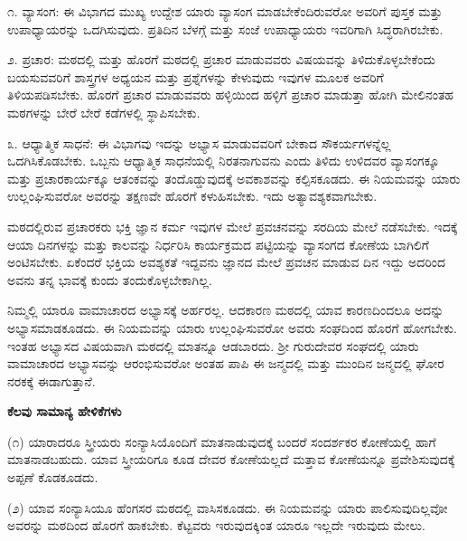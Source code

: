 ೧. ವ್ಯಾಸಂಗ: ಈ ವಿಭಾಗದ ಮುಖ್ಯ ಉದ್ದೇಶ ಯಾರು ವ್ಯಾಸಂಗ ಮಾಡಬೇಕೆಂದಿರುವರೋ ಅವರಿಗೆ ಪುಸ್ತಕ ಮತ್ತು ಉಪಾಧ್ಯಾಯರನ್ನು ಒದಗಿಸುವುದು. ಪ್ರತಿದಿನ ಬೆಳಗ್ಗೆ ಮತ್ತು ಸಂಜೆ ಉಪಾಧ್ಯಾಯರು ಇವರಿಗಾಗಿ ಸಿದ್ಧರಾಗಿರಬೇಕು.
\vspace{0.3cm}

೨. ಪ್ರಚಾರ: ಮಠದಲ್ಲಿ ಮತ್ತು ಹೊರಗೆ\enginline{-} ಮಠದಲ್ಲಿ ಪ್ರಚಾರ ಮಾಡುವವರು ವಿಷಯವನ್ನು ತಿಳಿದುಕೊಳ್ಳಬೇಕೆಂದು ಬಯಸುವವರಿಗೆ ಶಾಸ್ತ್ರಗಳ ಅಧ್ಯಯನ ಮತ್ತು ಪ್ರಶ್ನೆಗಳನ್ನು ಕೇಳುವುದು ಇವುಗಳ ಮೂಲಕ ಅವರಿಗೆ ತಿಳಿಯಪಡಿಸಬೇಕು. ಹೊರಗೆ ಪ್ರಚಾರ ಮಾಡುವವರು ಹಳ್ಳಿಯಿಂದ ಹಳ್ಳಿಗೆ ಪ್ರಚಾರ ಮಾಡುತ್ತಾ ಹೋಗಿ ಮೇಲಿನಂತಹ ಮಠಗಳನ್ನು ಬೇರೆ ಬೇರೆ ಕಡೆಗಳಲ್ಲಿ ಸ್ಥಾಪಿಸಬೇಕು.
\vspace{0.3cm}

೩. ಆಧ್ಯಾತ್ಮಿಕ ಸಾಧನೆ: ಈ ವಿಭಾಗವು ಇದನ್ನು ಅಭ್ಯಾಸ ಮಾಡುವವರಿಗೆ ಬೇಕಾದ ಸೌಕರ್ಯಗಳನ್ನೆಲ್ಲ ಒದಗಿಸಿಕೊಡಬೇಕು. ಒಬ್ಬನು ಆಧ್ಯಾತ್ಮಿಕ ಸಾಧನೆಯಲ್ಲಿ ನಿರತನಾಗುವನು ಎಂದು ತಿಳಿದು ಉಳಿದವರ ವ್ಯಾಸಂಗಕ್ಕೂ ಮತ್ತು ಪ್ರಚಾರಕಾರ್ಯಕ್ಕೂ ಆತಂಕವನ್ನು ತಂದೊಡ್ಡುವುದಕ್ಕೆ ಅವಕಾಶವನ್ನು ಕಲ್ಪಿಸಕೂಡದು. ಈ ನಿಯಮವನ್ನು ಯಾರು ಉಲ್ಲಂಘಿಸುವರೋ ಅವರನ್ನು ತಕ್ಷಣವೇ ಹೊರಗೆ ಕಳುಹಿಸಬೇಕು. ಇದು ಅತ್ಯಾವಶ್ಯಕವಾಗಬೇಕು.
\vspace{0.2cm}

ಮಠದಲ್ಲಿರುವ ಪ್ರಚಾರಕರು ಭಕ್ತಿ ಜ್ಞಾನ ಕರ್ಮ ಇವುಗಳ ಮೇಲೆ ಪ್ರವಚನವನ್ನು ಸರದಿಯ ಮೇಲೆ ನಡೆಸಬೇಕು. ಇದಕ್ಕೆ ಆಯಾ ದಿನಗಳನ್ನು ಮತ್ತು ಕಾಲವನ್ನು ನಿರ್ಧರಿಸಿ ಕಾರ್ಯಕ್ರಮದ ಪಟ್ಟಿಯನ್ನು ವ್ಯಾಸಂಗದ ಕೋಣೆಯ ಬಾಗಿಲಿಗೆ ಅಂಟಿಸಬೇಕು. ಏಕೆಂದರೆ ಭಕ್ತಿಯ ಅವಶ್ಯಕತೆ ಇದ್ದವನು ಜ್ಞಾನದ ಮೇಲೆ ಪ್ರವಚನ ಮಾಡುವ ದಿನ ಇದ್ದು ಅದರಿಂದ ಅವನು ತನ್ನ ಭಾವಕ್ಕೆ ಕುಂದು ತಂದುಕೊಳ್ಳಬೇಕಾಗಿಲ್ಲ.

\vspace{0.2cm}

ನಿಮ್ಮಲ್ಲಿ ಯಾರೂ ವಾಮಾಚಾರದ ಅಭ್ಯಾಸಕ್ಕೆ ಅರ್ಹರಲ್ಲ. ಆದಕಾರಣ ಮಠದಲ್ಲಿ ಯಾವ ಕಾರಣದಿಂದಲೂ ಅದನ್ನು ಅಭ್ಯಾಸಮಾಡಕೂಡದು. ಈ ನಿಯಮವನ್ನು ಯಾರು ಉಲ್ಲಂಘಿಸುವರೋ ಅವರು ಸಂಘದಿಂದ ಹೊರಗೆ ಹೋಗಬೇಕು. ಇಂತಹ ಅಭ್ಯಾಸದ ವಿಷಯವಾಗಿ ಮಠದಲ್ಲಿ ಮಾತನ್ನೂ ಆಡಬಾರದು. ಶ‍್ರೀ ಗುರುದೇವರ ಸಂಘದಲ್ಲಿ ಯಾರು ವಾಮಾಚಾರದ ಅಭ್ಯಾಸವನ್ನು ಆರಂಭಿಸುವರೋ ಅಂತಹ ಪಾಪಿ ಈ ಜನ್ಮದಲ್ಲಿ ಮತ್ತು ಮುಂದಿನ ಜನ್ಮದಲ್ಲಿ ಘೋರ ನರಕಕ್ಕೆ ಈಡಾಗುತ್ತಾನೆ.

\vspace{0.2cm}

\begin{center}
\textbf{ಕೆಲವು ಸಾಮಾನ್ಯ ಹೇಳಿಕೆಗಳು}
\end{center}

\vspace{0.15cm}

(೧) ಯಾರಾದರೂ ಸ್ತ್ರೀಯರು ಸಂನ್ಯಾಸಿಯೊಂದಿಗೆ ಮಾತನಾಡುವುದಕ್ಕೆ ಬಂದರೆ ಸಂದರ್ಶಕರ ಕೋಣೆಯಲ್ಲಿ ಹಾಗೆ ಮಾತನಾಡಬಹುದು. ಯಾವ ಸ್ತ್ರೀಯರಿಗೂ ಕೂಡ ದೇವರ ಕೋಣೆಯಲ್ಲದೆ ಮತ್ತಾವ ಕೋಣೆಯನ್ನೂ ಪ್ರವೇಶಿಸುವುದಕ್ಕೆ ಅಪ್ಪಣೆ ಕೊಡಕೂಡದು.

\vspace{0.15cm}

(೨) ಯಾವ ಸಂನ್ಯಾಸಿಯೂ ಹೆಂಗಸರ ಮಠದಲ್ಲಿ ವಾಸಿಸಕೂಡದು. ಈ ನಿಯಮವನ್ನು ಯಾರು ಪಾಲಿಸುವುದಿಲ್ಲವೋ ಅವರನ್ನು ಮಠದಿಂದ ಹೊರಗೆ ಹಾಕಬೇಕು. ಕೆಟ್ಟವರು ಇರುವುದಕ್ಕಿಂತ ಯಾರೂ ಇಲ್ಲದೇ ಇರುವುದು ಮೇಲು.

